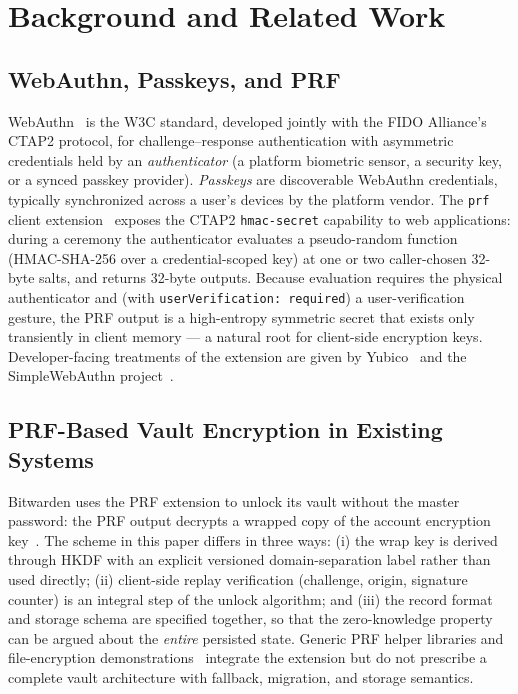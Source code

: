 \documentclass[runningheads]{llncs}
\begin{document}
\section{Background and Related Work}
\subsection{WebAuthn, Passkeys, and PRF}
WebAuthn~\cite{webauthn-spec} is the W3C standard, developed jointly with the FIDO Alliance's CTAP2 protocol, for challenge--response authentication with asymmetric credentials held by an \emph{authenticator} (a platform biometric sensor, a security key, or a synced passkey provider).
\emph{Passkeys} are discoverable WebAuthn credentials, typically synchronized across a user's devices by the platform vendor.
The \texttt{prf} client extension~\cite{webauthn-spec,webauthn-prf-docs} exposes the CTAP2 \texttt{hmac-secret} capability to web applications: during a ceremony the authenticator evaluates a pseudo-random function (HMAC-SHA-256 over a credential-scoped key) at one or two caller-chosen 32-byte salts, and returns 32-byte outputs.
Because evaluation requires the physical authenticator and (with \texttt{userVerification:\,required}) a user-verification gesture, the PRF output is a high-entropy symmetric secret that exists only transiently in client memory --- a natural root for client-side encryption keys.
Developer-facing treatments of the extension are given by Yubico~\cite{webauthn-prf-docs} and the SimpleWebAuthn project~\cite{simplewebauthn-prf}.

\subsection{PRF-Based Vault Encryption in Existing Systems}
Bitwarden uses the PRF extension to unlock its vault without the master password: the PRF output decrypts a wrapped copy of the account encryption key~\cite{bitwarden-prf-blog}.
The scheme in this paper differs in three ways: (i) the wrap key is derived through HKDF with an explicit versioned domain-separation label rather than used directly; (ii) client-side replay verification (challenge, origin, signature counter) is an integral step of the unlock algorithm; and (iii) the record format and storage schema are specified together, so that the zero-knowledge property can be argued about the \emph{entire} persisted state.
Generic PRF helper libraries and file-encryption demonstrations~\cite{holestorage-prf} integrate the extension but do not prescribe a complete vault architecture with fallback, migration, and storage semantics.
\end{document}
